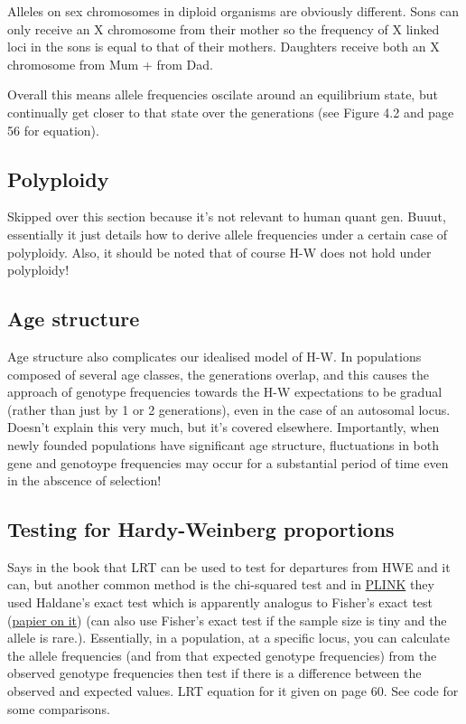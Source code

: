 \documentclass[
]{book}
\begin{document}
Alleles on sex chromosomes in diploid organisms are obviously different. Sons can only receive an X chromosome from their mother so the frequency of X linked loci in the sons is equal to that of their mothers. Daughters receive both an X chromosome from Mum + from Dad.

Overall this means allele frequencies oscilate around an equilibrium state, but continually get closer to that state over the generations (see Figure 4.2 and page 56 for equation).

\hypertarget{polyploidy}{%
\subsection{Polyploidy}\label{polyploidy}}

Skipped over this section because it's not relevant to human quant gen. Buuut, essentially it just details how to derive allele frequencies under a certain case of polyploidy. Also, it should be noted that of course H-W does not hold under polyploidy!

\hypertarget{age-structure}{%
\subsection{Age structure}\label{age-structure}}

Age structure also complicates our idealised model of H-W. In populations composed of several age classes, the generations overlap, and this causes the approach of genotype frequencies towards the H-W expectations to be gradual (rather than just by 1 or 2 generations), even in the case of an autosomal locus. Doesn't explain this very much, but it's covered elsewhere. Importantly, when newly founded populations have significant age structure, fluctuations in both gene and genotoype frequencies may occur for a substantial period of time even in the abscence of selection!

\hypertarget{testing-for-hardy-weinberg-proportions}{%
\subsection{Testing for Hardy-Weinberg proportions}\label{testing-for-hardy-weinberg-proportions}}

Says in the book that LRT can be used to test for departures from HWE and it can, but another common method is the chi-squared test and in \href{https://www.cog-genomics.org/plink/1.9/}{PLINK} they used Haldane's exact test which is apparently analogus to Fisher's exact test (\href{https://www.genetics.org/content/183/4/1431}{papier on it}) (can also use Fisher's exact test if the sample size is tiny and the allele is rare.). Essentially, in a population, at a specific locus, you can calculate the allele frequencies (and from that expected genotype frequencies) from the observed genotype frequencies then test if there is a difference between the observed and expected values. LRT equation for it given on page 60. See code for some comparisons.
\end{document}
